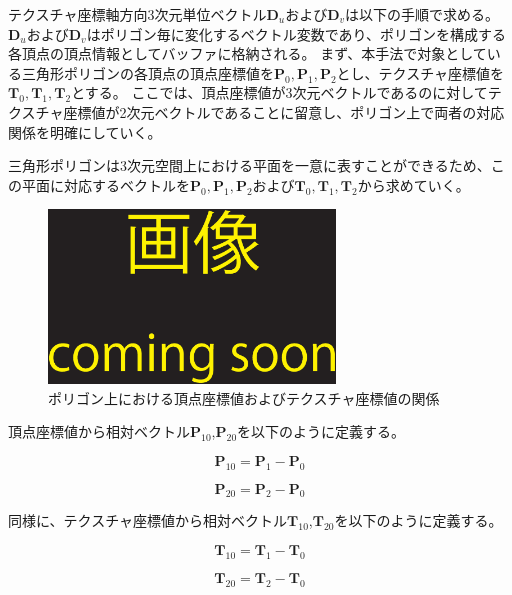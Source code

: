 テクスチャ座標軸方向3次元単位ベクトル$\bm{D}_u$および$\bm{D}_v$は以下の手順で求める。
$\bm{D}_u$および$\bm{D}_v$はポリゴン毎に変化するベクトル変数であり、ポリゴンを構成する各頂点の頂点情報としてバッファに格納される。
まず、本手法で対象としている三角形ポリゴンの各頂点の頂点座標値を$\bm{P}_0,\bm{P}_1,\bm{P}_2$とし、テクスチャ座標値を$\bm{T}_0,\bm{T}_1,\bm{T}_2$とする。
ここでは、頂点座標値が3次元ベクトルであるのに対してテクスチャ座標値が2次元ベクトルであることに留意し、ポリゴン上で両者の対応関係を明確にしていく。

三角形ポリゴンは3次元空間上における平面を一意に表すことができるため、この平面に対応するベクトルを$\bm{P}_0,\bm{P}_1,\bm{P}_2$および$\bm{T}_0,\bm{T}_1,\bm{T}_2$から求めていく。

\begin{figure}[h]
  \centering
  \includegraphics[width=3.0in]{./img/TEMP}
  \caption{ポリゴン上における頂点座標値およびテクスチャ座標値の関係}
  \label{FVertexandtexture}
\end{figure}

\noindent
頂点座標値から相対ベクトル$\bm{P}_{10}$,$\bm{P}_{20}$を以下のように定義する。

\begin{equation}
\bm{P}_{10} = \bm{P}_1 - \bm{P}_0
\label{EP10}
\end{equation}

\begin{equation}
\bm{P}_{20} = \bm{P}_2 - \bm{P}_0
\label{EP20}
\end{equation}

\noindent
同様に、テクスチャ座標値から相対ベクトル$\bm{T}_{10}$,$\bm{T}_{20}$を以下のように定義する。

\begin{equation}
\bm{T}_{10} = \bm{T}_1 - \bm{T}_0
\label{ET10}
\end{equation}

\begin{equation}
\bm{T}_{20} = \bm{T}_2 - \bm{T}_0
\label{ET20}
\end{equation}

